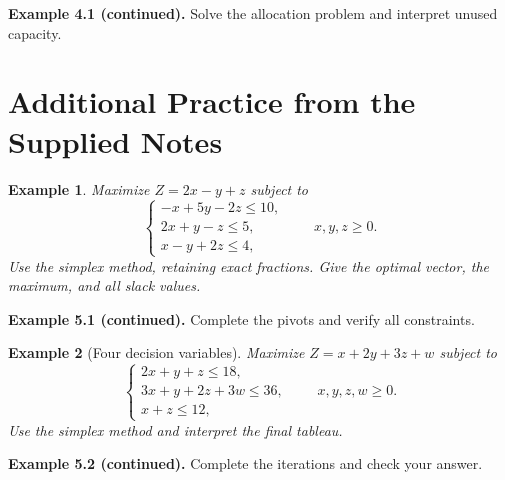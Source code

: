 \documentclass{article}
\theoremstyle{plain}
\newtheorem{example}{Example}[section]
\theoremstyle{definition}
\theoremstyle{remark}
\newcommand{\work}{\par\vfill}
\begin{document}
\work

\newpage
\textbf{Example 4.1 (continued).} Solve the allocation problem and interpret unused capacity.

\work

\newpage
\section{Additional Practice from the Supplied Notes}
\begin{example}\label{ex:practice3}
Maximize $Z=2x-y+z$ subject to
\[
\begin{cases}-x+5y-2z\le10,\\2x+y-z\le5,\\x-y+2z\le4,\end{cases}\qquad x,y,z\ge0.
\]
Use the simplex method, retaining exact fractions. Give the optimal vector, the maximum, and all slack values.
\end{example}

\work

\newpage
\textbf{Example 5.1 (continued).} Complete the pivots and verify all constraints.

\work

\newpage
\begin{example}[Four decision variables]\label{ex:practice4}
Maximize $Z=x+2y+3z+w$ subject to
\[
\begin{cases}2x+y+z\le18,\\3x+y+2z+3w\le36,\\x+z\le12,\end{cases}\qquad x,y,z,w\ge0.
\]
Use the simplex method and interpret the final tableau.
\end{example}

\work

\newpage
\textbf{Example 5.2 (continued).} Complete the iterations and check your answer.

\work

\newpage
\end{document}
